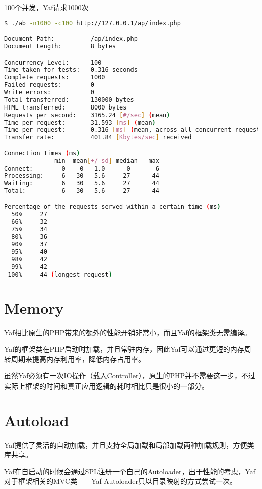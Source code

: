 \begin{example}
100个并发，Yaf请求1000次
\begin{lstlisting}[language=bash]
$ ./ab -n1000 -c100 http://127.0.0.1/ap/index.php

Document Path:          /ap/index.php
Document Length:        8 bytes

Concurrency Level:      100
Time taken for tests:   0.316 seconds
Complete requests:      1000
Failed requests:        0
Write errors:           0
Total transferred:      130000 bytes
HTML transferred:       8000 bytes
Requests per second:    3165.24 [#/sec] (mean)
Time per request:       31.593 [ms] (mean)
Time per request:       0.316 [ms] (mean, across all concurrent requests)
Transfer rate:          401.84 [Kbytes/sec] received

Connection Times (ms)
              min  mean[+/-sd] median   max
Connect:        0    0   1.0      0       6
Processing:     6   30   5.6     27      44
Waiting:        6   30   5.6     27      44
Total:          6   30   5.6     27      44

Percentage of the requests served within a certain time (ms)
  50%     27
  66%     32
  75%     34
  80%     36
  90%     37
  95%     40
  98%     42
  99%     42
 100%     44 (longest request)
\end{lstlisting}
\end{example}

\section{Memory}

Yaf相比原生的PHP带来的额外的性能开销非常小，而且Yaf的框架类无需编译。



Yaf的框架类在PHP启动时加载，并且常驻内存，因此Yaf可以通过更短的内存周转周期来提高内存利用率，降低内存占用率。

虽然Yaf必须有一次IO操作（载入Controller），原生的PHP并不需要这一步，不过实际上框架的时间和真正应用逻辑的耗时相比只是很小的一部分。

\section{Autoload}


Yaf提供了灵活的自动加载，并且支持全局加载和局部加载两种加载规则，方便类库共享。

Yaf在自启动的时候会通过SPL注册一个自己的Autoloader，出于性能的考虑，Yaf对于框架相关的MVC类——Yaf Autoloader只以目录映射的方式尝试一次。

